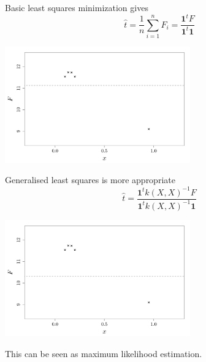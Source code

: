 \documentclass{beamer}
\begin{document}
\begin{frame}{}
Basic least squares minimization gives
$$ \displaystyle \hat{t} = \frac{1}{n} \sum_{i=1}^n F_i = \frac{\mathbf{1}^t F}{\mathbf{1}^t \mathbf{1}}$$
\begin{center}
	\includegraphics[height=5cm]{figures/trend_pbbasicordinary}
\end{center}
\end{frame}

\begin{frame}{}
Generalised least squares is more appropriate
$$ \displaystyle \hat{t} = \frac{\mathbf{1}^t k(X,X)^{-1} F}{\mathbf{1}^t k(X,X)^{-1} \mathbf{1}}$$
\begin{center}
	\includegraphics[height=5cm]{figures/trend_estimordinary}
\end{center}
This can be seen as maximum likelihood estimation.
\end{frame}
\end{document}
